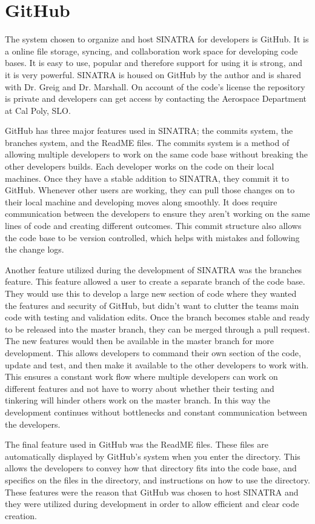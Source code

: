 \section{GitHub}
The system chosen to organize and host SINATRA for developers is GitHub. It is a online file storage, syncing, and collaboration work space for developing code bases. It is easy to use, popular and therefore support for using it is strong, and it is very powerful. SINATRA is housed on GitHub by the author and is shared with Dr. Greig and Dr. Marshall. On account of the code's license the repository is private and developers can get access by contacting the Aerospace Department at Cal Poly, SLO. \par
\indent GitHub has three major features used in SINATRA; the commits system, the branches system, and the ReadME files. The commits system is a method of allowing multiple developers to work on the same code base without breaking the other developers builds. Each developer works on the code on their local machines. Once they have a stable addition to SINATRA, they commit it to GitHub. Whenever other users are working, they can pull those changes on to their local machine and developing moves along smoothly. It does require communication between the developers to ensure they aren't working on the same lines of code and creating different outcomes. This commit structure also allows the code base to be version controlled, which helps with mistakes and following the change logs. \par
\indent Another feature utilized during the development of SINATRA was the branches feature. This feature allowed a user to create a separate branch of the code base. They would use this to develop a large new section of code where they wanted the features and security of GitHub, but didn't want to clutter the teams main code with testing and validation edits. Once the branch becomes stable and ready to be released into the master branch, they can be merged through a pull request. The new features would then be available in the master branch for more development. This allows developers to command their own section of the code, update and test, and then make it available to the other developers to work with. This ensures a constant work flow where multiple developers can work on different features and not have to worry about whether their testing and tinkering will hinder others work on the master branch. In this way the development continues without bottlenecks and constant communication between the developers. \par
\indent The final feature used in GitHub was the ReadME files. These files are automatically displayed by GitHub's system when you enter the directory. This allows the developers to convey how that directory fits into the code base, and specifics on the files in the directory, and instructions on how to use the directory. These features were the reason that GitHub was chosen to host SINATRA and they were utilized during development in order to allow efficient and clear code creation.
